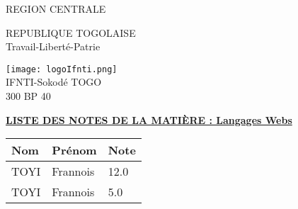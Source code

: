 \documentclass[10pt,a4paper]{article}
\begin{document}
\begin{minipage}{12cm}
\textsf{REGION CENTRALE} \\ \hspace{1cm}
\end{minipage}
\begin{minipage}{5cm}
REPUBLIQUE TOGOLAISE\\
Travail-Liberté-Patrie
\end{minipage}
\begin{minipage}{3cm}
\begin{center}
\texttt{[image: logoIfnti.png]} \\ \hspace{1cm}
IFNTI-Sokodé TOGO\\300 BP 40
\end{center}
\end{minipage}

\begin{center}
\underline{\textbf{LISTE DES NOTES DE LA MATIÈRE : Langages Webs}}
\end{center}

\begin{longtable}{|l|l|l|} \hline
\textbf{Nom} & \textbf{Prénom} & \textbf{Note} \\ \hline

TOYI & Frannois & 12.0 \\ \hline

TOYI & Frannois & 5.0 \\ \hline

\end{longtable}
\end{document}
